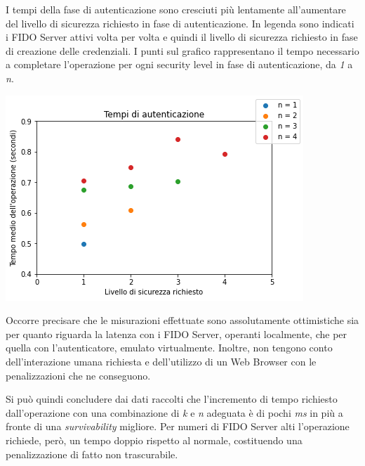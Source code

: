 I tempi della fase di autenticazione sono cresciuti più lentamente all'aumentare del livello di sicurezza richiesto in fase di autenticazione. In legenda sono indicati i FIDO Server attivi volta per volta e quindi il livello di sicurezza richiesto in fase di creazione delle credenziali. I punti sul grafico rappresentano il tempo necessario a completare l'operazione per ogni security level in fase di autenticazione, da \emph{1} a \emph{n}.
\begin{center}
	\includegraphics[scale=0.65]{figures/auth_results}
\end{center}

Occorre precisare che le misurazioni effettuate sono assolutamente ottimistiche sia per quanto riguarda la latenza con i FIDO Server, operanti localmente, che per quella con l'autenticatore, emulato virtualmente. Inoltre, non tengono conto dell'interazione umana richiesta e dell'utilizzo di un Web Browser con le penalizzazioni che ne conseguono. 

Si può quindi concludere dai dati raccolti che l'incremento di tempo richiesto dall'operazione con una combinazione di \emph{k} e \emph{n} adeguata è di pochi \emph{ms} in più a fronte di una \emph{survivability} migliore. Per numeri di FIDO Server alti l'operazione richiede, però, un tempo doppio rispetto al normale, costituendo una penalizzazione di fatto non trascurabile.
